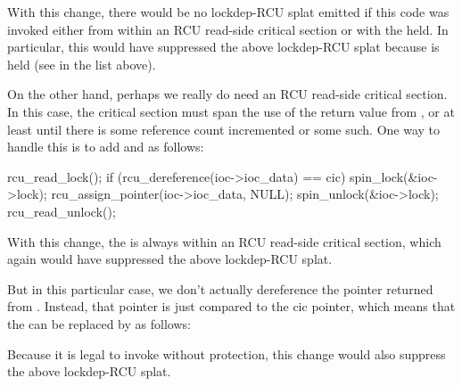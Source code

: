 \begin{VerbatimU}
	if (rcu_dereference_protected(ioc->ioc_data,
	                              lockdep_is_held(&q->queue_lock)) == cic) {
\end{VerbatimU}

With this change, there would be no lockdep-RCU splat emitted if this
code was invoked either from within an RCU read-side critical section
or with the  held.
In particular, this would have suppressed
the above lockdep-RCU splat because  is held (see  in the
list above).

On the other hand, perhaps we really do need an RCU read-side critical
section.
In this case, the critical section must span the use of the
return value from , or at least until there is some
reference count incremented or some such.
One way to handle this is to
add  and  as follows:

\begin{VerbatimU}
	rcu_read_lock();
	if (rcu_dereference(ioc->ioc_data) == cic) {
		spin_lock(&ioc->lock);
		rcu_assign_pointer(ioc->ioc_data, NULL);
		spin_unlock(&ioc->lock);
	}
	rcu_read_unlock();
\end{VerbatimU}

With this change, the  is always within an RCU
read-side critical section, which again would have suppressed the
above lockdep-RCU splat.

But in this particular case, we don't actually dereference the pointer
returned from .
Instead, that pointer is just compared
to the cic pointer, which means that the  can be replaced
by  as follows:

\begin{VerbatimU}
	if (rcu_access_pointer(ioc->ioc_data) == cic) {
\end{VerbatimU}

Because it is legal to invoke  without protection,
this change would also suppress the above lockdep-RCU splat.
